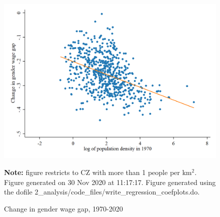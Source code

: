 \begin{figure}[!h]
\centering
\caption{Change in gender wage gap, 1970-2020}
\label{figure:overall_change}
\includegraphics[width=.5\textwidth]{../2_analysis/output/figures/change_1970_2020}
\par \begin{minipage}[h]{\textwidth}{\tiny\textbf{Note:} figure restricts to CZ with more than 1 people per km$^2$. Figure generated on 30 Nov 2020 at 11:17:17. Figure generated using the dofile 2\_analysis/code\_files/write\_regression\_coefplots.do.}\end{minipage}
\end{figure}
